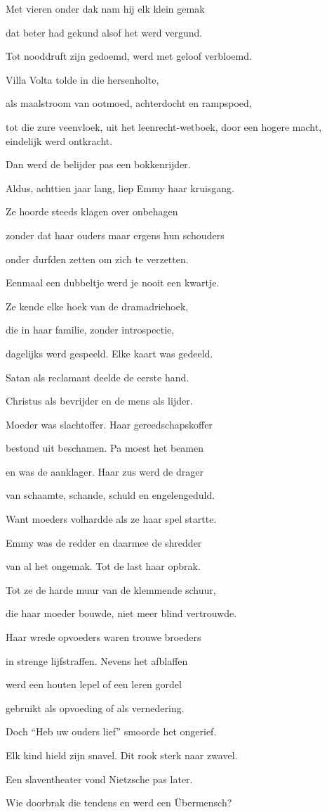 Met vieren onder dak
nam hij elk klein gemak

dat beter had gekund
alsof het werd vergund.

Tot nooddruft zijn gedoemd,
werd met geloof verbloemd.

Villa Volta tolde
in die hersenholte,

als maalstroom van ootmoed,
achterdocht en rampspoed,

tot die zure veenvloek,
uit het leenrecht-wetboek,
door een hogere macht,
eindelijk werd ontkracht.

Dan werd de belijder
pas een bokkenrijder.

Aldus, achttien jaar lang,
liep Emmy haar kruisgang.

Ze hoorde steeds klagen
over onbehagen

zonder dat haar ouders
maar ergens hun schouders

onder durfden zetten
om zich te verzetten.

Eenmaal een dubbeltje
werd je nooit een kwartje.

Ze kende elke hoek
van de dramadriehoek,

die in haar familie,
zonder introspectie,

dagelijks werd gespeeld.
Elke kaart was gedeeld.

Satan als reclamant
deelde de eerste hand.

Christus als bevrijder
en de mens als lijder.

Moeder was slachtoffer.
Haar gereedschapskoffer

bestond uit beschamen.
Pa moest het beamen

en was de aanklager.
Haar zus werd de drager

van schaamte, schande, schuld
en engelengeduld.

Want moeders volhardde
als ze haar spel startte.

Emmy was de redder
en daarmee de shredder

van al het ongemak.
Tot de last haar opbrak.

Tot ze de harde muur
van de klemmende schuur,

die haar moeder bouwde,
niet meer blind vertrouwde.

Haar wrede opvoeders
waren trouwe broeders

in strenge lijfstraffen.
Nevens het afblaffen

werd een houten lepel
of een leren gordel

gebruikt als opvoeding
of als vernedering.

Doch “Heb uw ouders lief”
smoorde het ongerief.

Elk kind hield zijn snavel.
Dit rook sterk naar zwavel.

Een slaventheater
vond Nietzsche pas later.

Wie doorbrak die tendens
en werd een Übermensch?
